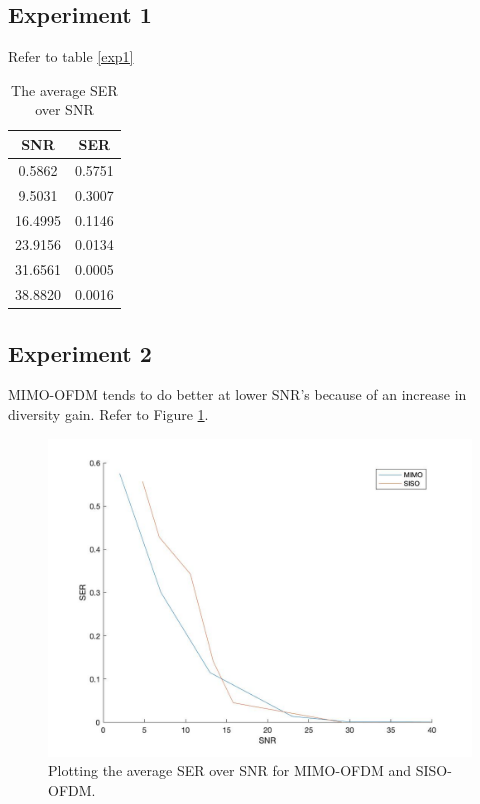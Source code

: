 \documentclass{book}
\begin{document}
\subsection{Experiment 1}
    Refer to table \ref{exp1}
    \begin{table}[h!] \caption{The average SER over SNR}
        \begin{center} 
            \begin{tabular}{c|c}
                SNR & SER  \\ \hline
              0.5862   & 0.5751 \\    
              9.5031   & 0.3007   \\ 
              16.4995  & 0.1146    \\
              23.9156  & 0.0134    \\
              31.6561  & 0.0005    \\
              38.8820  & 0.0016
            \end{tabular}
        \end{center}
    \end{table} \label{exp1}
\subsection{Experiment 2}
MIMO-OFDM tends to do better at lower SNR's because of an increase in diversity gain. Refer to Figure \ref{exp2}.
\begin{figure}
\begin{center}
\includegraphics[width=\columnwidth]{lab11/exp2.jpg}
\caption{Plotting the average SER over SNR for MIMO-OFDM and SISO-OFDM.} \label{exp2}
\end{center} 
\end{figure}
\end{document}
